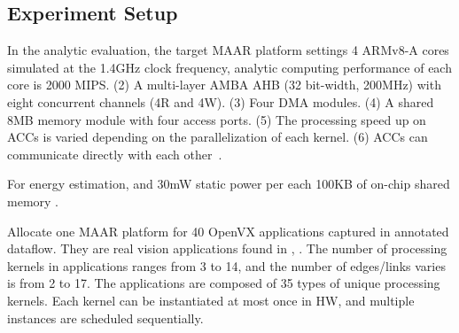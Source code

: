 \subsection{Experiment Setup}
\label{subsec:res-setup}

In the analytic evaluation, the target MAAR platform settings  4 ARMv8-A cores simulated at the 1.4GHz clock frequency, analytic computing performance of each core is 2000 MIPS. (2) A multi-layer AMBA AHB (32 bit-width, 200MHz) with eight concurrent channels (4R and 4W). (3) Four DMA modules. (4) A shared 8MB memory module with four access ports. (5) The processing speed up on ACCs is varied depending on the parallelization of each kernel. (6) ACCs can communicate directly with each other~\cite{teimouri2016improving}. 

For energy estimation,  and 30mW static power per each 100KB of on-chip shared memory \cite{malladi2012towards}.

Allocate one MAAR platform for 40 OpenVX applications captured in annotated dataflow. 
They are real vision applications found in \cite{Intel}, \cite{AMD}. 
The number of processing kernels in applications ranges from 3 to 14, and the number of edges/links varies is from 2 to 17. 
The applications are composed of 35 types of unique processing kernels.
Each kernel can be instantiated at most once in HW, and multiple instances are scheduled sequentially.